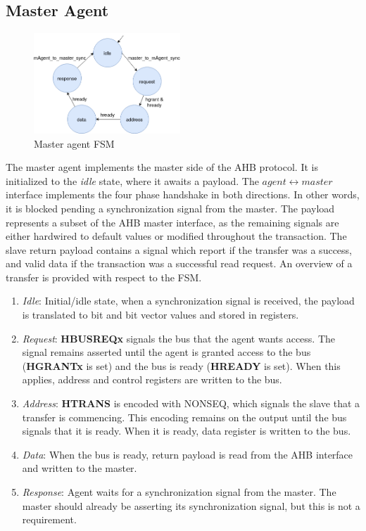 \newpage
\subsection{Master Agent}
\label{sub:magt-rtl}
\begin{figure}
\includegraphics[width=5.5cm]{figs/hw/mAgent_FSM.png}
\caption{Master agent FSM}\label{fig:rafsm}
\end{figure}  

The master agent implements the master side of the AHB protocol. It is initialized to the \textit{idle} state, where it awaits a payload. The $agent\leftrightarrow master$ interface implements the four phase handshake in both directions. In other words, it is blocked pending a synchronization signal from the master. The payload represents a subset of the AHB master interface, as the remaining signals are either hardwired to default values or modified throughout the transaction. The slave return payload contains a signal which report if the transfer was a success, and valid data if the transaction was a successful read request. An overview of a transfer is provided with respect to the FSM.
\begin{enumerate}
 \item \textit{Idle}: Initial/idle state, when a synchronization signal is received, the payload is translated to bit and bit vector values and stored in registers.
 \item \textit{Request}: \textbf{HBUSREQx} signals the bus that the agent wants access. The signal remains asserted until the agent is granted access to the bus (\textbf{HGRANTx} is set) and the bus is ready (\textbf{HREADY} is set). When this applies, address and control registers are written to the bus. 
 \item \textit{Address}: \textbf{HTRANS} is encoded with NONSEQ, which signals the slave that a transfer is commencing. This encoding remains on the output until the bus signals that it is ready. When it is ready, data register is written to the bus. 
 \item \textit{Data}: When the bus is ready, return payload is read from the AHB interface and written to the master.
 \item \textit{Response}: Agent waits for a synchronization signal from the master. The master should already be asserting its synchronization signal, but this is not a requirement.   
\end{enumerate}

